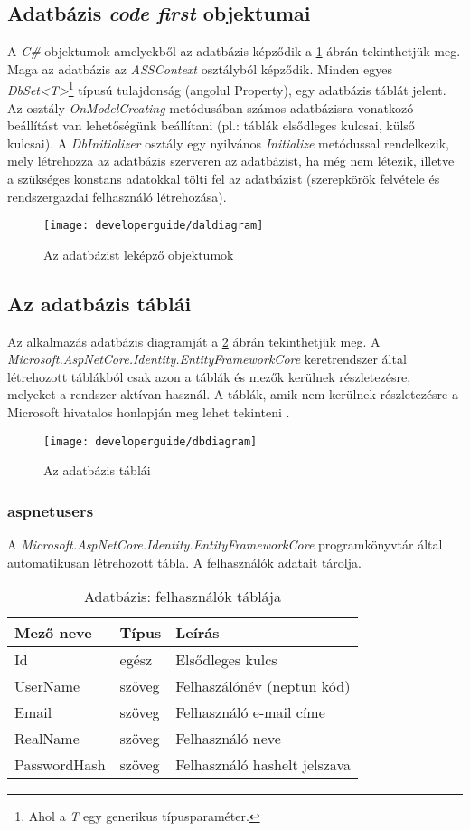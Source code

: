 \subsection{Adatbázis \emph{code first} objektumai}
A \emph{C\#} objektumok amelyekből az adatbázis képződik a \ref{fig:daldiagram} ábrán tekinthetjük meg. Maga az adatbázis az \emph{ASSContext} osztályból képződik. Minden egyes \emph{DbSet<T>}\footnote{Ahol a \emph{T} egy generikus típusparaméter.} típusú tulajdonság (angolul Property), egy adatbázis táblát jelent. Az osztály \emph{OnModelCreating} metódusában számos adatbázisra vonatkozó beállítást van lehetőségünk beállítani (pl.: táblák elsődleges kulcsai, külső kulcsai). A \emph{DbInitializer} osztály egy nyilvános \emph{Initialize} metódussal rendelkezik, mely létrehozza az adatbázis szerveren az adatbázist, ha még nem létezik, illetve a szükséges konstans adatokkal tölti fel az adatbázist (szerepkörök felvétele és rendszergazdai felhasználó létrehozása).
\begin{figure}[H]
	\centering
	\texttt{[image: developerguide/daldiagram]}
	\caption{Az adatbázist leképző objektumok}
	\label{fig:daldiagram}
\end{figure}
\subsection{Az adatbázis táblái}
Az alkalmazás adatbázis diagramját a \ref{fig:dbdiagram} ábrán tekinthetjük meg. A \emph{Microsoft.AspNetCore.Identity.EntityFrameworkCore} keretrendszer által létrehozott táblákból csak azon a táblák és mezők kerülnek részletezésre, melyeket a rendszer aktívan használ. A táblák, amik nem kerülnek részletezésre a Microsoft hivatalos honlapján meg lehet tekinteni \cite{Identity}.
\begin{figure}[H]
	\centering
	\texttt{[image: developerguide/dbdiagram]}
	\caption{Az adatbázis táblái}
	\label{fig:dbdiagram}
\end{figure}
\subsubsection{aspnetusers}
A \emph{Microsoft.AspNetCore.Identity.EntityFrameworkCore} programkönyvtár által automatikusan létrehozott tábla. A felhasználók adatait tárolja.
\begin{table}[H]
	\centering
	\begin{tabular}{ | m{} | m{} | m{} | }
		\hline
		\textbf{Mező neve} & \textbf{Típus} & \textbf{Leírás} \\
		\hline \hline
		Id & egész & Elsődleges kulcs \\
		\hline
		UserName & szöveg & Felhaszálónév (neptun kód) \\
		\hline
		Email & szöveg & Felhasználó e-mail címe \\
		\hline
		RealName & szöveg & Felhasználó neve \\
		\hline
		PasswordHash & szöveg & Felhasználó hashelt jelszava \\
		\hline
	\end{tabular}
	\caption{Adatbázis: felhasználók táblája}
	\label{tab:db-users}
\end{table}

